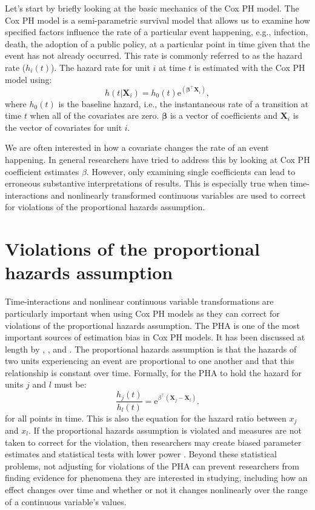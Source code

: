 \documentclass[nojss]{jss}\usepackage[]{graphicx}\usepackage[]{color}
\begin{document}
Let's start by briefly looking at the basic mechanics of the Cox PH model. The Cox PH model is a semi-parametric survival model that allows us to examine how specified factors influence the rate of a particular event happening, e.g., infection, death, the adoption of a public policy, at a particular point in time given that the event has not already occurred. This rate is commonly referred to as the hazard rate ($h_{i}(t)$). The hazard rate for unit $i$ at time $t$ is estimated with the Cox PH model using:
%
\begin{equation}
    h(t|\mathbf{X}_{i}) = h_{0}(t)\mathrm{e}^{(\mathbf{\beta^\intercal X}_{i})},
\end{equation}
%
where $h_{0}(t)$ is the baseline hazard, i.e., the instantaneous rate of a transition at time $t$ when all of the covariates are zero. $\mathbf{\beta}$ is a vector of coefficients and $\mathbf{X}_{i}$ is the vector of covariates for unit $i$.

We are often interested in how a covariate changes the rate of an event happening. In general researchers have tried to address this by looking at Cox PH coefficient estimates $\beta$. However, only examining single coefficients can lead to erroneous substantive interpretations of results. This is especially true when time-interactions and nonlinearly transformed continuous variables are used to correct for violations of the proportional hazards assumption.

\section[Violations of the PHA]{Violations of the proportional hazards assumption}

Time-interactions and nonlinear continuous variable transformations are particularly important when using Cox PH models as they can correct for violations of the proportional hazards assumption. The PHA is one of the most important sources of estimation bias in Cox PH models. It has been discussed at length by \cite{Licht2011}, \cite{BoxSteffensmeier2001}, and \cite{boxsteffensmeier2004}. The proportional hazards assumption is that the hazards of two units experiencing an event are proportional to one another and that this relationship is constant over time. Formally, for the PHA to hold the hazard for units $j$ and $l$ must be:
%
\begin{equation}
    \frac{h_{j}(t)}{h_{l}(t)} = \mathrm{e}^{\beta^\intercal(\mathbf{X}_{j} - \mathbf{X}_{l})}.
\end{equation}
%
for all points in time. This is also the equation for the hazard ratio between $x_{j}$ and $x_{l}$. If the proportional hazards assumption is violated and measures are not taken to correct for the violation, then researchers may create biased parameter estimates and statistical tests with lower power \citep{Therneau1990,Keele2010}. Beyond these statistical problems, not adjusting for violations of the PHA can prevent researchers from finding evidence for phenomena they are interested in studying, including how an effect changes over time and whether or not it changes nonlinearly over the range of a continuous variable's values.
\end{document}
